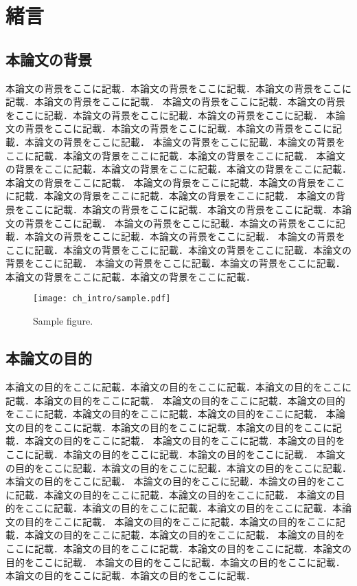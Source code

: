 \chapter{緒言}
\label{chap:intro}

\section{本論文の背景}
本論文の背景をここに記載．本論文の背景をここに記載．本論文の背景をここに記載．本論文の背景をここに記載．
本論文の背景をここに記載．本論文の背景をここに記載．本論文の背景をここに記載．本論文の背景をここに記載．
本論文の背景をここに記載．本論文の背景をここに記載．本論文の背景をここに記載．本論文の背景をここに記載．
本論文の背景をここに記載．本論文の背景をここに記載．本論文の背景をここに記載．本論文の背景をここに記載．
本論文の背景をここに記載．本論文の背景をここに記載．本論文の背景をここに記載．本論文の背景をここに記載．
本論文の背景をここに記載．本論文の背景をここに記載．本論文の背景をここに記載．本論文の背景をここに記載．
本論文の背景をここに記載．本論文の背景をここに記載．本論文の背景をここに記載．本論文の背景をここに記載．
本論文の背景をここに記載．本論文の背景をここに記載．本論文の背景をここに記載．本論文の背景をここに記載．
本論文の背景をここに記載．本論文の背景をここに記載．本論文の背景をここに記載．本論文の背景をここに記載．
本論文の背景をここに記載．本論文の背景をここに記載．本論文の背景をここに記載．本論文の背景をここに記載．

\begin{figure}[!t]
\centering
\texttt{[image: ch\_intro/sample.pdf]}
\caption{Sample figure.}
\label{fig:intro:sample}
\end{figure}

\section{本論文の目的}
本論文の目的をここに記載．本論文の目的をここに記載．本論文の目的をここに記載．本論文の目的をここに記載．
本論文の目的をここに記載．本論文の目的をここに記載．本論文の目的をここに記載．本論文の目的をここに記載．
本論文の目的をここに記載．本論文の目的をここに記載．本論文の目的をここに記載．本論文の目的をここに記載．
本論文の目的をここに記載．本論文の目的をここに記載．本論文の目的をここに記載．本論文の目的をここに記載．
本論文の目的をここに記載．本論文の目的をここに記載．本論文の目的をここに記載．本論文の目的をここに記載．
本論文の目的をここに記載．本論文の目的をここに記載．本論文の目的をここに記載．本論文の目的をここに記載．
本論文の目的をここに記載．本論文の目的をここに記載．本論文の目的をここに記載．本論文の目的をここに記載．
本論文の目的をここに記載．本論文の目的をここに記載．本論文の目的をここに記載．本論文の目的をここに記載．
本論文の目的をここに記載．本論文の目的をここに記載．本論文の目的をここに記載．本論文の目的をここに記載．
本論文の目的をここに記載．本論文の目的をここに記載．本論文の目的をここに記載．本論文の目的をここに記載．

